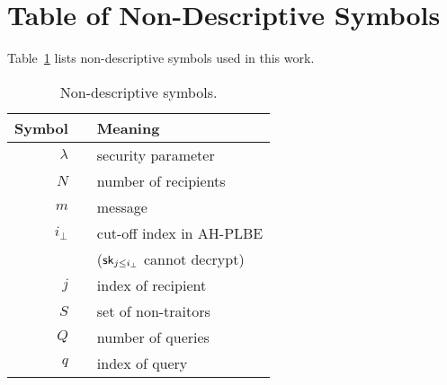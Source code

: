 \section{Table of Non-Descriptive Symbols}

Table~\ref{tab:symbols} lists non-descriptive symbols used in this work.

\begin{table}
\capstart
\centering
\caption{Non-descriptive symbols.}
\label{tab:symbols}
\begin{tabular}{rcl}
\toprule
\hspace*{0.5em}\textbf{Symbol} &\WideNarrow{}{\hspace*{0.5em}}&
\textbf{Meaning}\hspace*{0.5em} \\
\midrule
$\lambda$ && security parameter \\
$N$ && number of recipients \\
$m$ && message \\
$i_\bot$ && cut-off index in AH-PLBE \\
&& \quad ($\sk_{j\leq i_\bot}$ cannot decrypt) \\
$j$ && index of recipient \\
$S$ && set of non-traitors \\
$Q$ && number of queries \\
$q$ && index of query \\
\bottomrule
\end{tabular}
\end{table}
